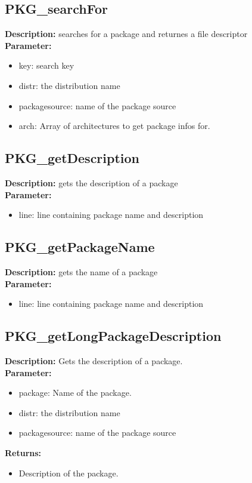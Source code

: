 \subsection{PKG\_searchFor}
\textbf{Description:} searches for a package and returnes a file descriptor\\
\textbf{Parameter:}
\begin{itemize}
\item key: search key
\item distr: the distribution name
\item packagesource: name of the package source
\item arch: Array of architectures to get package infos for.
\end{itemize}

\subsection{PKG\_getDescription}
\textbf{Description:} gets the description of a package\\
\textbf{Parameter:}
\begin{itemize}
\item line: line containing package name and description
\end{itemize}

\subsection{PKG\_getPackageName}
\textbf{Description:} gets the name of a package\\
\textbf{Parameter:}
\begin{itemize}
\item line: line containing package name and description
\end{itemize}

\subsection{PKG\_getLongPackageDescription}
\textbf{Description:} Gets the description of a package.\\
\textbf{Parameter:}
\begin{itemize}
\item package: Name of the package.
\item distr: the distribution name
\item packagesource: name of the package source
\end{itemize}
\textbf{Returns:}
\begin{itemize}
\item Description of the package.
\end{itemize}

